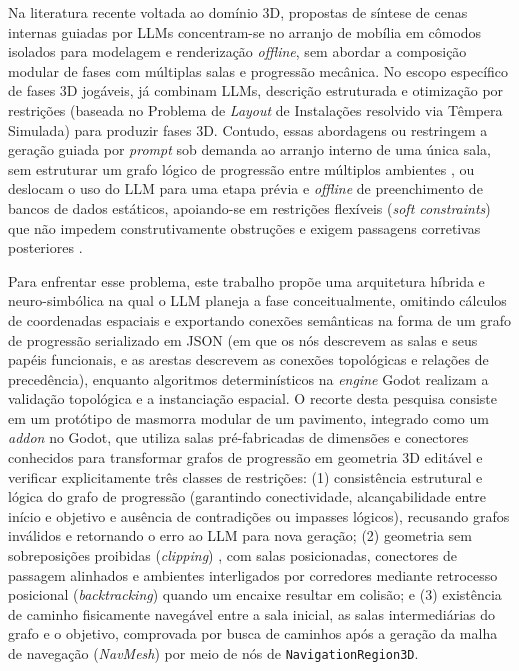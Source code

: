 Na literatura recente voltada ao domínio 3D, propostas de síntese de cenas internas guiadas por LLMs \cite{ocal2024sceneteller, hu2024scenecraft, sun2024roomplanner, yang2026codeasroomgenerating3drooms} concentram-se no arranjo de mobília em cômodos isolados para modelagem e renderização \textit{offline}, sem abordar a composição modular de fases com múltiplas salas e progressão mecânica. No escopo específico de fases 3D jogáveis, \textcite{xu2025constraint, xu2025databasedrivenframework3dlevel} já combinam LLMs, descrição estruturada e otimização por restrições (baseada no Problema de \textit{Layout} de Instalações resolvido via Têmpera Simulada) para produzir fases 3D. Contudo, essas abordagens ou restringem a geração guiada por \textit{prompt} sob demanda ao arranjo interno de uma única sala, sem estruturar um grafo lógico de progressão entre múltiplos ambientes \cite{xu2025constraint}, ou deslocam o uso do LLM para uma etapa prévia e \textit{offline} de preenchimento de bancos de dados estáticos, apoiando-se em restrições flexíveis (\textit{soft constraints}) que não impedem construtivamente obstruções e exigem passagens corretivas posteriores \cite{xu2025databasedrivenframework3dlevel}.

Para enfrentar esse problema, este trabalho propõe uma arquitetura híbrida e neuro-simbólica \cite{garcez2023neurosymbolic} na qual o LLM planeja a fase conceitualmente, omitindo cálculos de coordenadas espaciais e exportando conexões semânticas na forma de um grafo de progressão serializado em JSON (em que os nós descrevem as salas e seus papéis funcionais, e as arestas descrevem as conexões topológicas e relações de precedência), enquanto algoritmos determinísticos na \textit{engine} Godot realizam a validação topológica e a instanciação espacial. O recorte desta pesquisa consiste em um protótipo de masmorra modular de um pavimento, integrado como um \textit{addon} no Godot, que utiliza salas pré-fabricadas de dimensões e conectores conhecidos para transformar grafos de progressão em geometria 3D editável e verificar explicitamente três classes de restrições: (1) consistência estrutural e lógica do grafo de progressão (garantindo conectividade, alcançabilidade entre início e objetivo e ausência de contradições ou impasses lógicos), recusando grafos inválidos e retornando o erro ao LLM para nova geração; (2) geometria sem sobreposições proibidas (\textit{clipping}) \cite{ericson2004realtime}, com salas posicionadas, conectores de passagem alinhados e ambientes interligados por corredores mediante retrocesso posicional (\textit{backtracking}) quando um encaixe resultar em colisão; e (3) existência de caminho fisicamente navegável entre a sala inicial, as salas intermediárias do grafo e o objetivo, comprovada por busca de caminhos \cite{hart1968formal} após a geração da malha de navegação (\textit{NavMesh}) \cite{snook2000simplified} por meio de nós de \texttt{NavigationRegion3D}.

